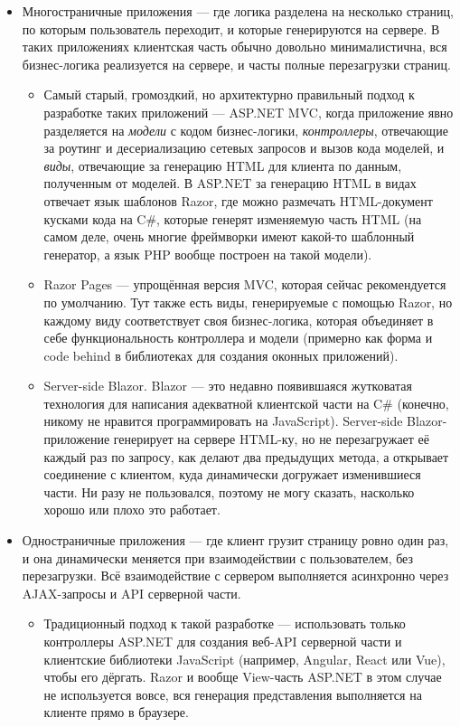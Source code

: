 \documentclass[a5paper]{article}
\begin{document}
\begin{itemize}
    \item Многостраничные приложения --- где логика разделена на несколько страниц, по которым пользователь переходит, и которые генерируются на сервере. В таких приложениях клиентская часть обычно довольно минималистична, вся бизнес-логика реализуется на сервере, и часты полные перезагрузки страниц.
    \begin{itemize}
        \item Самый старый, громоздкий, но архитектурно правильный подход к разработке таких приложений --- ASP.NET MVC, когда приложение явно разделяется на \emph{модели} с кодом бизнес-логики, \emph{контроллеры}, отвечающие за роутинг и десериализацию сетевых запросов и вызов кода моделей, и \emph{виды}, отвечающие за генерацию HTML для клиента по данным, полученным от моделей. В ASP.NET за генерацию HTML в видах отвечает язык шаблонов Razor, где можно размечать HTML-документ кусками кода на C\#, которые генерят изменяемую часть HTML (на самом деле, очень многие фреймворки имеют какой-то шаблонный генератор, а язык PHP вообще построен на такой модели).
        \item Razor Pages --- упрощённая версия MVC, которая сейчас рекомендуется по умолчанию. Тут также есть виды, генерируемые с помощью Razor, но каждому виду соответствует своя бизнес-логика, которая объединяет в себе функциональность контроллера и модели (примерно как форма и code behind в библиотеках для создания оконных приложений).
        \item Server-side Blazor. Blazor --- это недавно появившаяся жутковатая технология для написания адекватной клиентской части на C\# (конечно, никому не нравится программировать на JavaScript). Server-side Blazor-приложение генерирует на сервере HTML-ку, но не перезагружает её каждый раз по запросу, как делают два предыдущих метода, а открывает соединение с клиентом, куда динамически догружает изменившиеся части. Ни разу не пользовался, поэтому не могу сказать, насколько хорошо или плохо это работает.
    \end{itemize}
    \item Одностраничные приложения --- где клиент грузит страницу ровно один раз, и она динамически меняется при взаимодействии с пользователем, без перезагрузки. Всё взаимодействие с сервером выполняется асинхронно через AJAX-запросы и API серверной части.
    \begin{itemize}
        \item Традиционный подход к такой разработке --- использовать только контроллеры ASP.NET для создания веб-API серверной части и клиентские библиотеки JavaScript (например, Angular, React или Vue), чтобы его дёргать. Razor и вообще View-часть ASP.NET в этом случае не используется вовсе, вся генерация представления выполняется на клиенте прямо в браузере.

\end{itemize}
\end{itemize}
\end{document}

